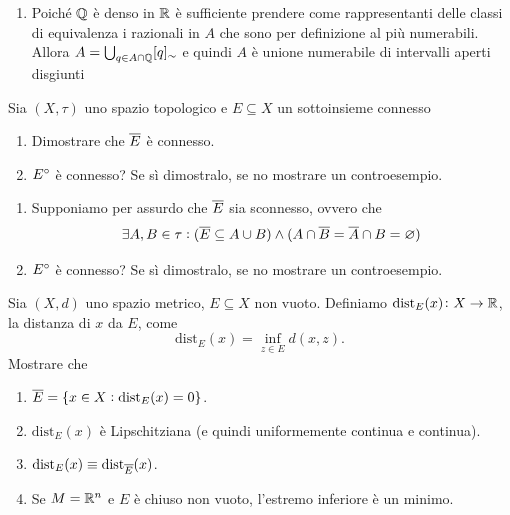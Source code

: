 \documentclass[a4paper]{article}\par \usepackage{style}\par
\begin{document}
\begin{enumerate}[label = (\roman*)]
\item Poiché $ \mathbb{Q} $ è denso in $ \mathbb{R} $ è sufficiente prendere come rappresentanti delle classi di equivalenza i razionali in $ A $ che sono per definizione al più numerabili. Allora $ A = \bigcup_{q \in A \cap \mathbb{Q}} [q]_{\sim} $ e quindi $ A $ è unione numerabile di intervalli aperti disgiunti
\end{enumerate}\par \begin{vares}
  Sia $ (X, \tau) $ uno spazio topologico e $ E \subseteq X $ un sottoinsieme connesso
  \begin{enumerate}[label = (\roman*)]
  \item Dimostrare che $ \overline{E} $ è connesso.
  \item $ {E}^{\circ} $ è connesso? Se sì dimostralo, se no mostrare un controesempio.
  \end{enumerate}
\end{vares}\par \begin{enumerate}[label = (\roman*)]
\item Supponiamo per assurdo che $ \overline{E} $ sia sconnesso, ovvero che \[\exists A, B \in \tau : (\overline{E} \subseteq A \cup B) \wedge (A \cap \overline{B} = \overline{A} \cap B = \varnothing)\]
\item $ {E}^{\circ} $ è connesso? Se sì dimostralo, se no mostrare un controesempio.
\end{enumerate}\par \begin{vares} \label{es:distanza_da_insieme}
  Sia $ (X, d) $ uno spazio metrico, $ E \subseteq X $ non vuoto. Definiamo $ \mathrm{dist}_E(x) \colon X \to \mathbb{R} $, la distanza di $ x $ da $ E $, come \[\mathrm{dist}_E(x) = \inf_{z \in E}{d(x, z)}.\] Mostrare che
  \begin{enumerate}[label = (\roman*)]
  \item $ \overline{E} = \{x \in X : \mathrm{dist}_E(x) = 0\} $.
  \item $ \mathrm{dist}_E(x) $ è Lipschitziana (e quindi uniformemente continua e continua).
  \item $ \mathrm{dist}_E(x) \equiv \mathrm{dist}_{\overline{E}}(x) $.
  \item Se $ M = \mathbb{R}^n $ e $ E $ è chiuso non vuoto, l'estremo inferiore è un minimo.
  \end{enumerate}
\end{vares}\par \begin{enumerate}[label = (\roman*)]

\end{enumerate}
\end{document}
